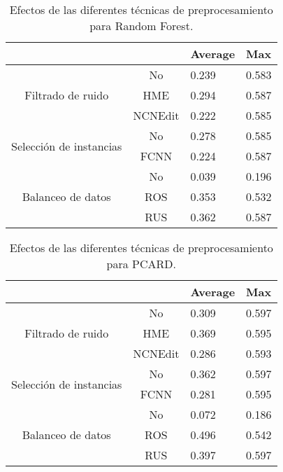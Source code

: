 \begin{table}[]
    \centering
    \begin{tabular}{cc|l|l|}
    \cline{3-4}
    \multicolumn{1}{l}{\textbf{}} & \textbf{} & \multicolumn{1}{c|}{\textbf{Average}} & \textbf{Max} \\ \hline
    \multicolumn{1}{|c|}{\multirow{3}{*}{Filtrado de ruido}}       & No        & 0.239    & 0.583    \\ \cline{2-4} 
    \multicolumn{1}{|c|}{}  & HME       & 0.294         & 0.587        \\ \cline{2-4} 
    \multicolumn{1}{|c|}{}  & NCNEdit   & 0.222         & 0.585        \\ \hline
    \multicolumn{1}{|c|}{\multirow{2}{*}{Selección de instancias}} & No        & 0.278         & 0.585        \\ \cline{2-4} 
    \multicolumn{1}{|c|}{}  & FCNN      & 0.224         & 0.587        \\ \hline
    \multicolumn{1}{|c|}{\multirow{3}{*}{Balanceo de datos}}       & No        & 0.039         & 0.196        \\ \cline{2-4} 
    \multicolumn{1}{|c|}{}  & ROS       & 0.353         & 0.532        \\ \cline{2-4} 
    \multicolumn{1}{|c|}{}  & RUS       & 0.362         & 0.587        \\ \hline
    \end{tabular}
    \caption{Efectos de las diferentes técnicas de preprocesamiento para Random Forest.}
\end{table}

\begin{table}[]
    \centering
    \begin{tabular}{cc|l|l|}
    \cline{3-4}
    \multicolumn{1}{l}{\textbf{}} & \textbf{} & \multicolumn{1}{c|}{\textbf{Average}} & \textbf{Max} \\ \hline
    \multicolumn{1}{|c|}{\multirow{3}{*}{Filtrado de ruido}}       & No        & 0.309         & 0.597        \\ \cline{2-4} 
    \multicolumn{1}{|c|}{}  & HME       & 0.369         & 0.595        \\ \cline{2-4} 
    \multicolumn{1}{|c|}{}  & NCNEdit   & 0.286         & 0.593        \\ \hline
    \multicolumn{1}{|c|}{\multirow{2}{*}{Selección de instancias}} & No        & 0.362         & 0.597        \\ \cline{2-4} 
    \multicolumn{1}{|c|}{}  & FCNN      & 0.281         & 0.595        \\ \hline
    \multicolumn{1}{|c|}{\multirow{3}{*}{Balanceo de datos}}       & No        & 0.072         & 0.186        \\ \cline{2-4} 
    \multicolumn{1}{|c|}{}  & ROS       & 0.496         & 0.542        \\ \cline{2-4} 
    \multicolumn{1}{|c|}{}  & RUS       & 0.397         & 0.597        \\ \hline
    \end{tabular}
    \caption{Efectos de las diferentes técnicas de preprocesamiento para PCARD.}
\end{table}

